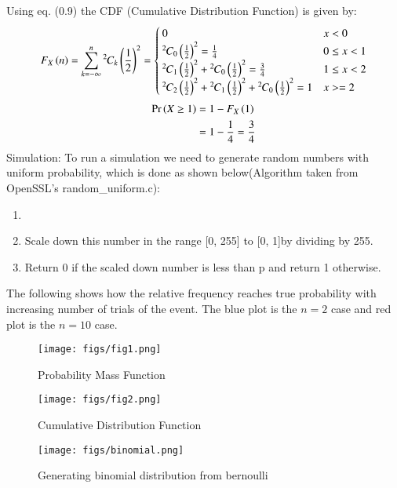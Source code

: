 \documentclass[journal]{IEEEtran}
\begin{document}
Using eq. (0.9) the CDF (Cumulative Distribution Function) is given by:
\begin{align}
  F_{X}\left(n\right) = \sum_{k = -\infty}^n{{}^{2}\mkern-1muC_{k}}\left(\frac{1}{2}\right)^2 = \begin{cases}
    0 & x < 0\\
    {{}^{2}\mkern-1muC_{0}}\left(\frac{1}{2}\right)^2 = \frac{1}{4} & 0 \le x < 1\\
    {{}^{2}\mkern-1muC_{1}}\left(\frac{1}{2}\right)^2 + {{}^{2}\mkern-1muC_{0}}\left(\frac{1}{2}\right)^2 = \frac{3}{4}& 1 \le x < 2\\
    {{}^{2}\mkern-1muC_{2}}\left(\frac{1}{2}\right)^2 + {{}^{2}\mkern-1muC_{1}}\left(\frac{1}{2}\right)^2 + {{}^{2}\mkern-1muC_{0}}\left(\frac{1}{2}\right)^2 = 1 & x >=2\\
  \end{cases}
\end{align}
\begin{align}
  \Pr\left(X \ge 1\right) &= 1 - F_X\left(1\right)\\
  &= 1 - \frac{1}{4} = \frac{3}{4}
\end{align}
Simulation:
\newline
To run a simulation we need to generate random numbers with uniform probability, which is done
as shown below(Algorithm taken from OpenSSL's random\_uniform.c):
\begin{enumerate}
  \item {}
  \item Scale down this number in the range [0, 255] to [0, 1]by dividing by 255.
  \item Return 0 if the scaled down number is less than p and return 1 otherwise. 
\end{enumerate}
The following shows how the relative frequency reaches true probability with increasing number of trials of the event. The blue plot is the $n = 2$ case and red plot is the $n = 10$ case.
\begin{figure}[h!]
   \centering
   \texttt{[image: figs/fig1.png]}
    \caption{Probability Mass Function}
\end{figure}
\begin{figure}[h!]
   \centering
   \texttt{[image: figs/fig2.png]}
    \caption{Cumulative Distribution Function}
\end{figure}

\begin{figure}[h!]
   \centering
   \texttt{[image: figs/binomial.png]}
    \caption{Generating binomial distribution from bernoulli}
\end{figure}
\end{document}
